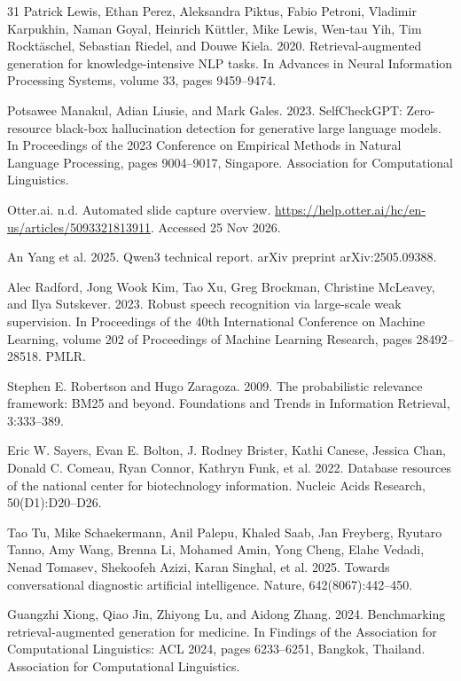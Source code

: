 \documentclass[11pt]{article}
\begin{document}
\begin{thebibliography}{31}
Patrick Lewis, Ethan Perez, Aleksandra Piktus, Fabio Petroni, Vladimir Karpukhin, Naman Goyal, Heinrich Küttler, Mike Lewis, Wen-tau Yih, Tim Rocktäschel, Sebastian Riedel, and Douwe Kiela. 2020. Retrieval-augmented generation for knowledge-intensive NLP tasks. In Advances in Neural Information Processing Systems, volume 33, pages 9459--9474.

Potsawee Manakul, Adian Liusie, and Mark Gales. 2023. SelfCheckGPT: Zero-resource black-box hallucination detection for generative large language models. In Proceedings of the 2023 Conference on Empirical Methods in Natural Language Processing, pages 9004--9017, Singapore. Association for Computational Linguistics.

Otter.ai. n.d. Automated slide capture overview. \url{https://help.otter.ai/hc/en-us/articles/5093321813911}. Accessed 25 Nov 2026.

An Yang et al. 2025. Qwen3 technical report. arXiv preprint arXiv:2505.09388.

Alec Radford, Jong Wook Kim, Tao Xu, Greg Brockman, Christine McLeavey, and Ilya Sutskever. 2023. Robust speech recognition via large-scale weak supervision. In Proceedings of the 40th International Conference on Machine Learning, volume 202 of Proceedings of Machine Learning Research, pages 28492--28518. PMLR.

Stephen E. Robertson and Hugo Zaragoza. 2009. The probabilistic relevance framework: BM25 and beyond. Foundations and Trends in Information Retrieval, 3:333--389.

Eric W. Sayers, Evan E. Bolton, J. Rodney Brister, Kathi Canese, Jessica Chan, Donald C. Comeau, Ryan Connor, Kathryn Funk, et al. 2022. Database resources of the national center for biotechnology information. Nucleic Acids Research, 50(D1):D20--D26.

Tao Tu, Mike Schaekermann, Anil Palepu, Khaled Saab, Jan Freyberg, Ryutaro Tanno, Amy Wang, Brenna Li, Mohamed Amin, Yong Cheng, Elahe Vedadi, Nenad Tomasev, Shekoofeh Azizi, Karan Singhal, et al. 2025. Towards conversational diagnostic artificial intelligence. Nature, 642(8067):442--450.

Guangzhi Xiong, Qiao Jin, Zhiyong Lu, and Aidong Zhang. 2024. Benchmarking retrieval-augmented generation for medicine. In Findings of the Association for Computational Linguistics: ACL 2024, pages 6233--6251, Bangkok, Thailand. Association for Computational Linguistics.


\end{thebibliography}
\end{document}
